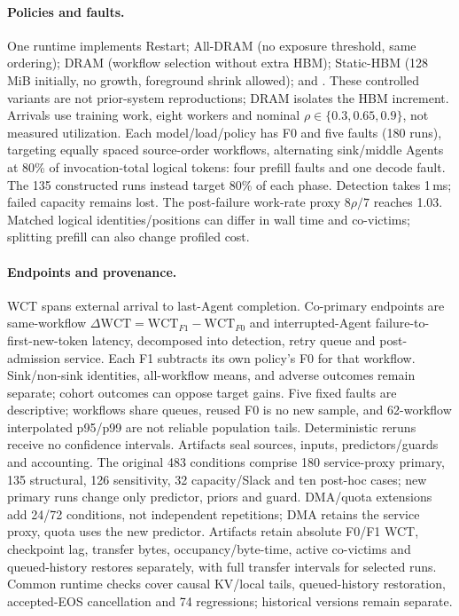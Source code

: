 \paragraph{Policies and faults.}
One runtime implements Restart; All-DRAM (no exposure threshold, same ordering);
DRAM (workflow selection without extra HBM); Static-HBM (128\,MiB initially,
no growth, foreground shrink allowed); and \system. These controlled variants
are not prior-system reproductions; DRAM isolates the HBM increment.
Arrivals use training work, eight workers and nominal
$\rho\in\{0.3,0.65,0.9\}$, not measured utilization.
Each model/load/policy has F0 and five faults (180 runs), targeting equally
spaced source-order workflows, alternating sink/middle Agents at 80\% of
invocation-total logical tokens: four prefill faults and one decode fault.
The 135 constructed runs instead target 80\% of each phase.
Detection takes 1\,ms; failed capacity remains lost. The post-failure work-rate
proxy $8\rho/7$ reaches 1.03. Matched logical identities/positions can differ
in wall time and co-victims; splitting prefill can also change profiled cost.

\paragraph{Endpoints and provenance.}
WCT spans external arrival to last-Agent completion. Co-primary endpoints
are same-workflow $\Delta\mathrm{WCT}=\mathrm{WCT}_{F1}-\mathrm{WCT}_{F0}$
and interrupted-Agent failure-to-first-new-token latency, decomposed into
detection, retry queue and post-admission service. Each F1 subtracts its own
policy's F0 for that workflow. Sink/non-sink identities, all-workflow means,
and adverse outcomes remain separate; cohort outcomes can oppose target gains.
Five fixed faults
are descriptive; workflows share queues, reused F0 is no new sample, and
62-workflow interpolated p95/p99 are not reliable population tails.
Deterministic reruns receive no confidence intervals.
Artifacts seal sources, inputs, predictors/guards and accounting. The original
483 conditions comprise 180 service-proxy primary, 135 structural, 126 sensitivity,
32 capacity/Slack and ten post-hoc cases; new primary runs change only predictor,
priors and guard. DMA/quota extensions add 24/72 conditions, not independent
repetitions; DMA retains the service proxy, quota uses the new predictor.
Artifacts retain absolute F0/F1 WCT, checkpoint lag, transfer bytes,
occupancy/byte-time, active co-victims and queued-history restores separately,
with full transfer intervals for selected runs.
Common runtime checks cover causal KV/local tails, queued-history
restoration, accepted-EOS cancellation and 74 regressions; historical versions
remain separate.

